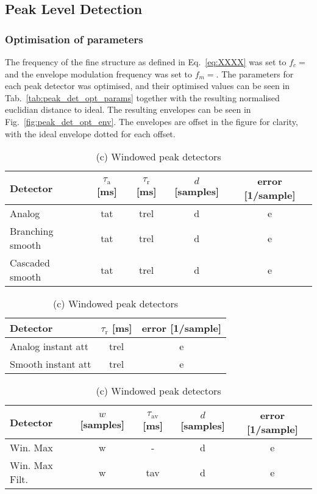 \documentclass[../main2.tex]{subfiles}
\begin{document}
\subsection{Peak Level Detection}

\subsubsection{Optimisation of parameters}
The frequency of the fine structure as defined in Eq.~\eqref{eq:XXXX} was set to $f_c = $ and the envelope modulation frequency was set to $f_m = $. The parameters for each peak detector was optimised, and their optimised values can be seen in Tab.~\ref{tab:peak_det_opt_params} together with the resulting normalised euclidian distance to ideal. The resulting envelopes can be seen in Fig.~\ref{fig:peak_det_opt_env}. The envelopes are offset in the figure for clarity, with the ideal envelope dotted for each offset.

\begin{table}[h]
\begin{center}
\caption{Optimised parameters for the various peak detectors, $f_c= $, $f_m= $}
\label{tab:peak_det_opt_params}
\caption*{(a) Attack and release peak detectors}
\begin{tabular}{| l | c c c | c |}
	\hline
	Detector 	& $\tau_\text{a}$ [ms] & $\tau_\text{r}$ [ms] & $d$ [samples] & error [1/sample]\\
	\hline
	
	Analog 			& tat 		& trel 	& d		& e	\\ 
	Branching smooth 	& tat 		& trel 	& d		& e	\\ 
	Cascaded smooth	& tat 		& trel 	& d		& e	\\
	\hline
\end{tabular}
\end{center}

\begin{center}
\caption*{(b) Instant attack peak detectors}
 \begin{tabular}{| l | c | c |}
	\hline
	Detector & $\tau_\text{r}$ [ms] & error [1/sample] \\
	\hline
	Analog instant att	& trel		& e	\\ 
	Smooth instant att	& trel		& e	\\ 
	\hline
\end{tabular}
\end{center}

\begin{center}
\caption*{(c) Windowed peak detectors}
\label{tab:peak_det_instatt_opt_params}
 \begin{tabular}{| l | c c c | c |}
	\hline
	Detector & $w$ [samples] & $\tau_\text{av}$ [ms] & $d$ [samples] & error [1/sample] \\
	\hline
	Win. Max		& w		& -		& d		& e	\\ 
	Win. Max Filt.	& w		& tav		& d		& e	\\
	\hline
\end{tabular}
\end{center}

\end{table}
\end{document}
